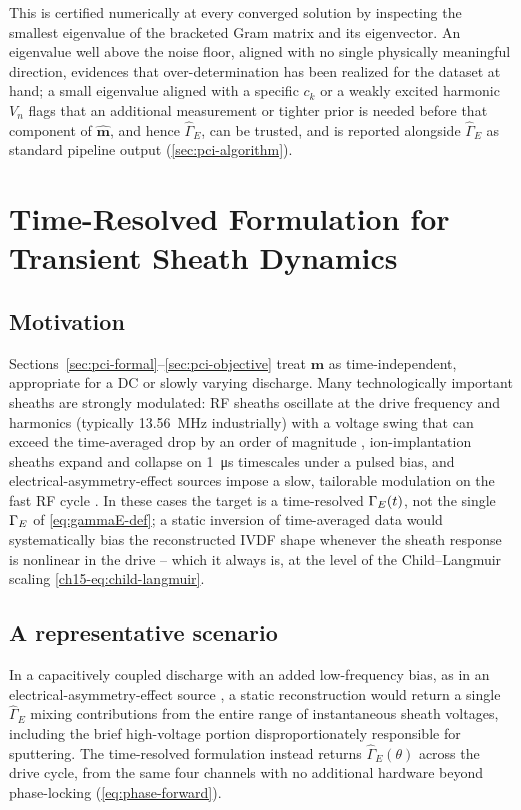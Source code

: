This is certified numerically at every converged solution by inspecting the smallest eigenvalue of the bracketed Gram matrix and its eigenvector. An eigenvalue well above the noise floor, aligned with no single physically meaningful direction, evidences that over-determination has been realized for the dataset at hand; a small eigenvalue aligned with a specific $c_{k}$ or a weakly excited harmonic $V_{n}$ flags that an additional measurement or tighter prior is needed before that component of $\hat{\mathbf m}$, and hence $\hat\Gamma_{E}$, can be trusted, and is reported alongside $\hat\Gamma_{E}$ as standard pipeline output (\cref{sec:pci-algorithm}).

\section{Time-Resolved Formulation for Transient Sheath Dynamics}
\label{sec:pci-time}

\subsection{Motivation}

Sections~\ref{sec:pci-formal}--\ref{sec:pci-objective} treat $\mathbf m$ as time-independent, appropriate for a DC or slowly varying discharge. Many technologically important sheaths are strongly modulated: RF sheaths oscillate at the drive frequency and harmonics (typically \SI{13.56}{\mega\hertz} industrially) with a voltage swing that can exceed the time-averaged drop by an order of magnitude \cite{ref0043}, ion-implantation sheaths expand and collapse on \SI{1}{\micro\second} timescales under a pulsed bias, and electrical-asymmetry-effect sources impose a slow, tailorable modulation on the fast RF cycle \cite{ref0106}. In these cases the target is a time-resolved $\Gamma_{E}(t)$, not the single $\Gamma_{E}$ of \cref{eq:gammaE-def}; a static inversion of time-averaged data would systematically bias the reconstructed IVDF shape whenever the sheath response is nonlinear in the drive -- which it always is, at the level of the Child--Langmuir scaling \cref{ch15-eq:child-langmuir}.

\subsection{A representative scenario}

In a capacitively coupled discharge with an added low-frequency bias, as in an electrical-asymmetry-effect source \cite{ref0106}, a static reconstruction would return a single $\hat\Gamma_{E}$ mixing contributions from the entire range of instantaneous sheath voltages, including the brief high-voltage portion disproportionately responsible for sputtering. The time-resolved formulation instead returns $\hat\Gamma_{E}(\theta)$ across the drive cycle, from the same four channels with no additional hardware beyond phase-locking (\cref{eq:phase-forward}).

